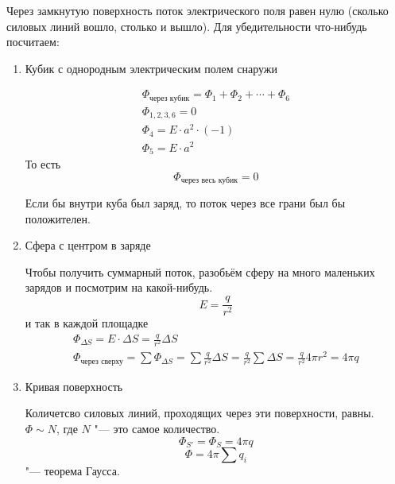 
Через замкнутую поверхность поток электрического поля равен нулю (сколько силовых линий вошло, столько и вышло).
Для убедительности что-нибудь посчитаем:
\begin{enumerate}
\item
	Кубик с однородным электрическим полем снаружи

	\begin{gather*}
		\Phi_{\text{через кубик}} = \Phi_1 + \Phi_2 + \cdots + \Phi_6 \\
		\Phi_{1, 2, 3, 6} = 0 \\
		\Phi_4 = E \cdot a^2 \cdot (-1) \\
		\Phi_5 = E \cdot a^2
	\end{gather*}
	То есть
	\[ \Phi_{\text{через весь кубик}} = 0 \]
	\begin{Rem}
		Если бы внутри куба был заряд, то поток через все грани был бы положителен.
	\end{Rem}

\item
	Сфера с центром в заряде

	Чтобы получить суммарный поток, разобьём сферу на много маленьких зарядов и посмотрим на какой-нибудь.
	\[E = \frac{q}{r^2}\]
	и так в каждой площадке
	\begin{gather*}
		\Phi_{\Delta S} = E \cdot \Delta S = \frac{q}{r^2}\Delta S \\
		\Phi_{\text{через сверху}} = \sum \Phi_{\Delta S} = \sum \frac{q}{r^2}\Delta S = \frac{q}{r^2}\sum\Delta S
			= \frac{q}{r^2}4\pi r^2 = 4 \pi q
	\end{gather*}

\item
	Кривая поверхность

	Количетсво силовых линий, проходящих через эти поверхности, равны. $\Phi \sim N$, где $N$ "--- это самое количество.
	\[\Phi_{S'} = \Phi_S = 4\pi q\]
	\[\Phi = 4\pi\sum q_i\] "--- теорема Гаусса.
\end{enumerate}

